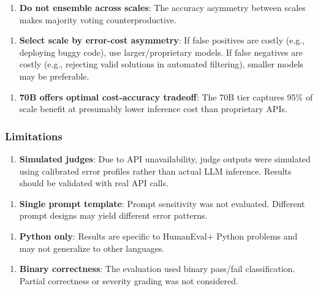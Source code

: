 \begin{enumerate}
\item \textbf{Do not ensemble across scales}: The accuracy asymmetry between scales makes majority voting counterproductive.
\end{enumerate}

\begin{enumerate}
\item \textbf{Select scale by error-cost asymmetry}: If false positives are costly (e.g., deploying buggy code), use larger/proprietary models. If false negatives are costly (e.g., rejecting valid solutions in automated filtering), smaller models may be preferable.
\end{enumerate}

\begin{enumerate}
\item \textbf{70B offers optimal cost-accuracy tradeoff}: The 70B tier captures 95\% of scale benefit at presumably lower inference cost than proprietary APIs.
\end{enumerate}

\subsubsection{Limitations}

\begin{enumerate}
\item \textbf{Simulated judges}: Due to API unavailability, judge outputs were simulated using calibrated error profiles rather than actual LLM inference. Results should be validated with real API calls.
\end{enumerate}

\begin{enumerate}
\item \textbf{Single prompt template}: Prompt sensitivity was not evaluated. Different prompt designs may yield different error patterns.
\end{enumerate}

\begin{enumerate}
\item \textbf{Python only}: Results are specific to HumanEval+ Python problems and may not generalize to other languages.
\end{enumerate}

\begin{enumerate}
\item \textbf{Binary correctness}: The evaluation used binary pass/fail classification. Partial correctness or severity grading was not considered.
\end{enumerate}

